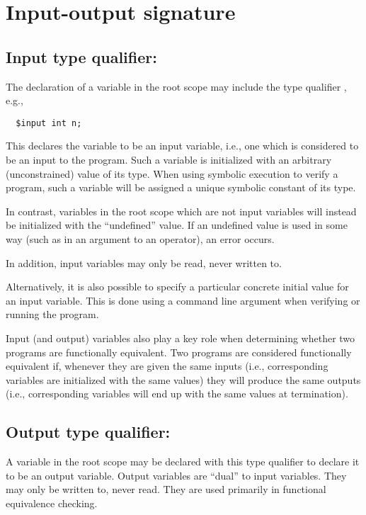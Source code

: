 \section{Input-output signature}

\subsection{Input type qualifier: \cinput}

The declaration of a variable in the root scope may
include the type qualifier \cinput, e.g.,
\begin{verbatim}
  $input int n;
\end{verbatim}
This declares the variable to be an input variable, i.e., one which is
considered to be an input to the program.  Such a variable is
initialized with an arbitrary (unconstrained) value of its type.  When
using symbolic execution to verify a program, such a variable will be
assigned a unique symbolic constant of its type.

In contrast, variables in the root scope which are not input variables
will instead be initialized with the ``undefined'' value.  If an
undefined value is used in some way (such as in an argument to an
operator), an error occurs.

In addition, input variables may only be read, never written to.

Alternatively, it is also possible to specify a particular concrete
initial value for an input variable.  This is done using a command
line argument when verifying or running the program.

Input (and output) variables also play a key role when determining
whether two programs are functionally equivalent.  Two programs are
considered functionally equivalent if, whenever they are given the
same inputs (i.e., corresponding \cinput{} variables are initialized
with the same values) they will produce the same outputs (i.e.,
corresponding \coutput{} variables will end up with the same values at
termination).

\subsection{Output type qualifier: \coutput}

A variable in the root scope may be declared with this type qualifier
to declare it to be an output variable.  Output variables are ``dual''
to input variables.  They may only be written to, never read.  They
are used primarily in functional equivalence checking.

